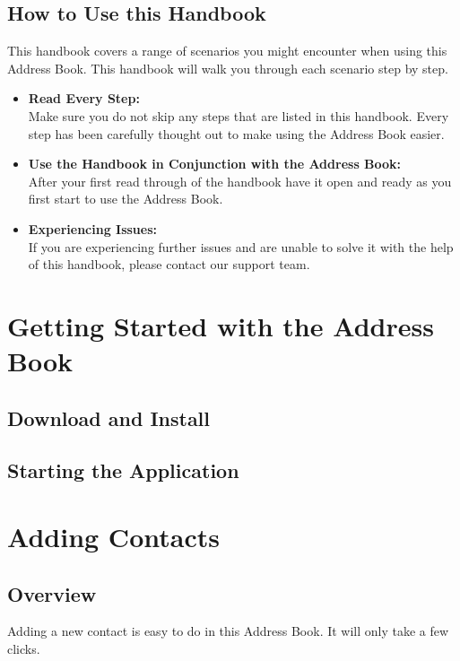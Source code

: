 \documentclass[a4paper, 11pt]{article}
\begin{document}
\subsection{How to Use this Handbook}
This handbook covers a range of scenarios you might encounter when using this Address Book. This handbook will walk you through each scenario step by step.
\begin{itemize}
	\item \textbf{Read Every Step:} \\ Make sure you do not skip any steps that are listed in this handbook. Every step has been carefully thought out to make using the Address Book easier.
	\item \textbf{Use the Handbook in Conjunction with the Address Book:} \\ After your first read through of the handbook have it open and ready as you first start to use the Address Book.
	\item \textbf{Experiencing Issues:} \\ If you are experiencing further issues and are unable to solve it with the help of this handbook, please contact our support team.
\end{itemize}


\section{Getting Started with the Address Book}
\subsection{Download and Install}
\subsection{Starting the Application}


\section{Adding Contacts}
\subsection{Overview}
Adding a new contact is easy to do in this Address Book. It will only take a few clicks.
\end{document}
